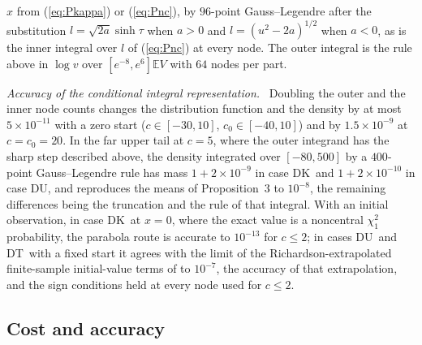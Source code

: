 \documentclass[ecta,nameyear,final,supplement]{econsocart}
\newcommand{\E}{{\mathbb E}}
\newcommand{\Fk}{\textsf{\upshape DK}}
\newcommand{\Fu}{\textsf{\upshape DU}}
\newcommand{\Ft}{\textsf{\upshape DT}}
\theoremstyle{plain}
\theoremstyle{definition}
\newcommand{\runin}[1]{\par\medskip\noindent\textit{#1.}\ \ignorespaces}
\begin{document}
$x$ from (\ref{eq:Pkappa}) or (\ref{eq:Pnc}), by $96$-point Gauss--Legendre after the substitution $l=\sqrt{2a}\sinh\tau$ when $a>0$ and $l=(u^2-2a)^{1/2}$ when $a<0$, as is the inner integral over $l$ of (\ref{eq:Pnc}) at every node.  The outer integral is the rule above in $\log v$ over $[e^{-8},e^6]\E V$ with $64$ nodes per part.

\runin{Accuracy of the conditional integral representation}  Doubling the outer and the inner node counts changes the distribution function and the density by at most $5\times10^{-11}$ with a zero start ($c\in[-30,10]$, $c_0\in[-40,10]$) and by $1.5\times10^{-9}$ at $c=c_0=20$.  In the far upper tail at $c=5$, where the outer integrand has the sharp step described above, the density integrated over $[-80,500]$ by a $400$-point Gauss--Legendre rule has mass $1+2\times10^{-9}$ in case \Fk\ and $1+2\times10^{-10}$ in case \Fu, and reproduces the means of Proposition~3 to $10^{-8}$, the remaining differences being the truncation and the rule of that integral.  With an initial observation, in case \Fk\ at $x=0$, where the exact value is a noncentral $\chi^2_1$ probability, the parabola route is accurate to $10^{-13}$ for $c\le2$; in cases \Fu\ and \Ft\ with a fixed start it agrees with the limit of the Richardson-extrapolated finite-sample initial-value terms of \cite{BaoBrodaKan2026} to $10^{-7}$, the accuracy of that extrapolation, and the sign conditions held at every node used for $c\le2$.

\subsection{Cost and accuracy}
\label{sec:cost}
\end{document}
